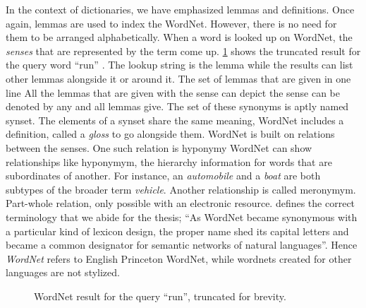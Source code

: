 In the context of dictionaries, we have emphasized lemmas and definitions.
Once again, lemmas are used to index the WordNet.
However, there is no need for them to be arranged alphabetically.
When a word is looked up on WordNet, the \emph{senses} that are represented by the term come up.
\ref{fig:example_run} shows the truncated result for the query word \enquote{run} .
The lookup string is the lemma while the results can list other lemmas alongside it or around it.
The set of lemmas that are given in one line
All the lemmas that are given with the sense can depict the sense can be denoted by any and all lemmas give.
The set of these synonyms is aptly named synset.
The elements of a synset share the same meaning, WordNet includes a definition, called a \emph{gloss} to go alongside them.
WordNet is built on relations between the senses.
One such relation is hyponymy
WordNet can show relationships like hyponymym, the hierarchy information for words that are subordinates of another.
For instance, an \emph{automobile} and a \emph{boat} are both subtypes of the broader term \emph{vehicle}.
Another relationship is called meronymym.
Part-whole relation, only possible with an electronic resource.
\textcite{fellbaum_semantic_1998} defines the correct terminology that we abide for the thesis; \enquote{As WordNet became synonymous with a particular kind of lexicon design, the proper name shed its capital letters and became a common designator for semantic networks of natural languages}.
Hence \emph{WordNet} refers to English Princeton WordNet, while wordnets created for other languages are not stylized.
\begin{figure}[!hbp]
    \begin{center}
        {%
            \setlength{\fboxsep}{1pt}%
            \setlength{\fboxrule}{1pt}%
        }%
    \caption{WordNet result for the query \enquote{run}, truncated for brevity.}\label{fig:example_run}
    \end{center}
\end{figure}

